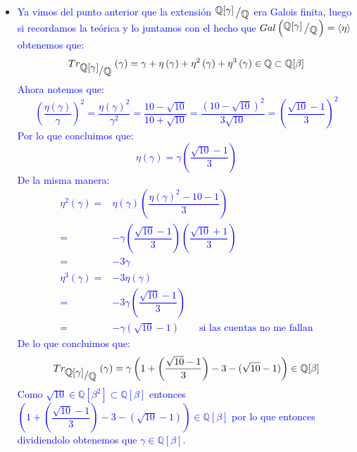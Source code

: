 \documentclass[11pt]{article}
\newcommand{\Q}{\mathbb{Q}}
\newcommand{\ip}[1]{\left\langle#1\right\rangle}
\newcommand{\quotient}[2]{{\raisebox{.2em}{$#1$}\left/\raisebox{-.2em}{$#2$}\right.}}
\numberwithin{theorem}{subsection}
\newcommand{\qed}{\nobreak \ifvmode \relax \else
	\ifdim\lastskip<1.5em \hskip-\lastskip
	\hskip1.5em plus0em minus0.5em \fi \nobreak
	\vrule height0.75em width0.5em depth0.25em\fi}
\begin{document}
\begin{enumerate}
\begin{itemize}
		\item \textcolor{blue}{Ya vimos del punto anterior que la extensi\'on $\quotient{\Q[\gamma]}{\Q}$ era Galois finita, luego si recordamos la te\'orica y lo juntamos con el hecho que $Gal\left(\quotient{\Q[\gamma]}{\Q}\right) = \ip{\eta}$ obtenemos que:
		\begin{equation*}
			Tr_{\quotient{\Q[\gamma]}{\Q}} \left(\gamma\right) = \gamma + \eta\left(\gamma\right) + \eta^2\left(\gamma\right) + \eta^3\left(\gamma\right) \in \Q \subset \Q[\beta]
		\end{equation*}
		Ahora notemos que:
		\begin{equation*}
		\left(\dfrac{\eta\left(\gamma\right)}{\gamma}\right)^2 = \dfrac{\eta\left(\gamma\right)^2}{\gamma^2} = \dfrac{10 - \sqrt{10}}{10 + \sqrt{10}} = \dfrac{\left(10 - \sqrt{10}\right)^2}{3 \sqrt{10}} = \left(\dfrac{\sqrt{10}-1}{3}\right)^2 
		\end{equation*}
		Por lo que concluimos que:
		\begin{equation*}
		\eta(\gamma) = \gamma \left(\dfrac{\sqrt{10}-1}{3}\right)
		\end{equation*}
		De la misma manera:
		\begin{equation*}
		\begin{aligned}
			\eta^2(\gamma) = & \eta(\gamma) \left(\dfrac{\eta(\gamma)^2 - 10 -1}{3}\right) \\
			= & -\gamma \left(\dfrac{\sqrt{10}-1}{3}\right) \left(\dfrac{\sqrt{10}+1}{3}\right) \\
			= & -3 \gamma \\
			\eta^3(\gamma) =& -3 \eta(\gamma) \\
			=& -3 \gamma \left(\dfrac{\sqrt{10}-1}{3}\right) \\
			= & - \gamma (\sqrt{10}-1) \qquad \text{si las cuentas no me fallan}
		\end{aligned}
		\end{equation*}
		De lo que concluimos que:
		\begin{equation*}
			Tr_{\quotient{\Q[\gamma]}{\Q}} \left(\gamma\right) = \gamma \left(1 + \left(\dfrac{\sqrt{10}-1}{3}\right) -3 - (\sqrt{10}-1) \right) \in \Q[\beta]
		\end{equation*}
		Como $\sqrt{10} \in \Q[\beta^2] \subset \Q[\beta]$ entonces $ \left(1 + \left(\dfrac{\sqrt{10}-1}{3}\right) -3 - (\sqrt{10}-1) \right) \in \Q[\beta]$ por lo que entonces dividiendolo obtenemos que $\gamma \in \Q[\beta]$.}\qed
		
	\end{itemize}
	

\end{enumerate}
\end{document}
